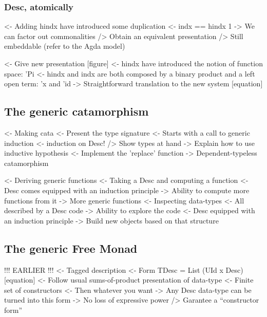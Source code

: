 \documentclass{article}
\newenvironment{structure}{\footnotesize\verbatim}{\endverbatim}
\begin{document}
\subsubsection{Desc, atomically}

\begin{structure}
<- Adding hindx have introduced some duplication
    <- indx == hindx 1
    -> We can factor out commonalities 
        /> Obtain an equivalent presentation
        /> Still embeddable (refer to the Agda model)
\end{structure}

\begin{structure}
<- Give new presentation [figure]
    <- hindx have introduced the notion of function space: 'Pi
    <- hindx and indx are both composed by a binary product and a left open term: 'x and 'id 
    -> Straightforward translation to the new system [equation]
\end{structure}

\subsection{The generic catamorphism}

\begin{structure}
<- Making cata
    <- Present the type signature
    <- Starts with a call to generic induction
        <- induction on Desc!
        /> Show types at hand
        -> Explain how to use inductive hypothesis
    <- Implement the 'replace' function
    -> Dependent-typeless catamorphism 
\end{structure}

\begin{structure}
<- Deriving generic functions
    <- Taking a Desc and computing a function
        <- Desc comes equipped with an induction principle
        -> Ability to compute more functions from it
            -> More generic functions
    <- Inspecting data-types
        <- All described by a Desc code
        -> Ability to explore the code
            <- Desc equipped with an induction principle
            -> Build new objects based on that structure
\end{structure}

\subsection{The generic Free Monad}

\begin{structure}
!!! EARLIER !!!
<- Tagged description
    <- Form TDesc = List (UId x Desc) [equation]
    <- Follow usual sums-of-product presentation of data-type
        <- Finite set of constructors
        <- Then whatever you want
    -> Any Desc data-type can be turned into this form
        -> No loss of expressive power
        /> Garantee a ``constructor form''
\end{structure}
\end{document}
